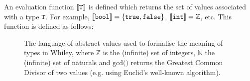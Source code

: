 An evaluation function ${\tt\llbracket T\rrbracket}$ is defined which returns the set of values associated with a type ${\tt T}$.  For example, ${\tt\llbracket bool\rrbracket=\{true,false\}}$, ${\tt\llbracket int\rrbracket=\mathbb{Z}}$, etc.  This function is defined as follows:

\begin{figure}[!t]
\caption{The language of abstract values used to formalise the meaning of types in Whiley, where $\mathbb{Z}$ is the (infinite) set of integers, $\mathbb{N}$ the (infinite) set of naturals and $\textrm{gcd()}$ returns the Greatest Common Divisor of two values (e.g. using Euclid's well-known algorithm).}
\label{c_types_abstract_values}
\end{figure}

